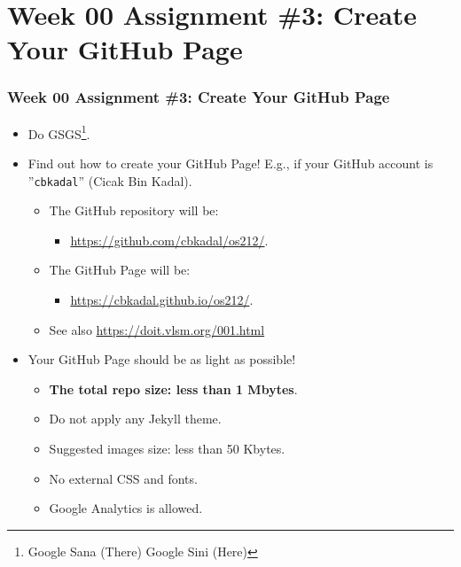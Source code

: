 \documentclass[xcolor=table, notheorems, hyperref={pdfpagelabels=false}]{beamer}
\begin{document}
\section{Week 00 Assignment \#3: Create Your GitHub Page}
\begin{frame}[fragile]
\frametitle{Week 00 Assignment \#3: Create Your GitHub Page}

\begin{itemize}
\item Do GSGS\footnote{Google Sana (There) Google Sini (Here)}. 
\item Find out how to create your GitHub Page! 
E.g., if your GitHub account is ''\texttt{cbkadal}'' (Cicak Bin Kadal).
\begin{itemize}
\item The GitHub repository will be:
\begin{itemize}
\item \url{https://github.com/cbkadal/os212/}.
\end{itemize}
\item The GitHub Page will be:
\begin{itemize}
\item \url{https://cbkadal.github.io/os212/}. 
\end{itemize}
\item See also \url{https://doit.vlsm.org/001.html}
\end{itemize}
\item Your GitHub Page should be as light as possible!
\begin{itemize}
\item \textbf{The total repo size: less than 1 Mbytes}.
\item Do not apply any Jekyll theme.
\item Suggested images size: less than 50 Kbytes.
\item No external CSS and fonts.
\item Google Analytics is allowed.
\end{itemize}
\end{itemize}

\end{frame}

\end{document}
